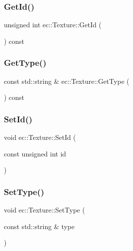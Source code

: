 \mbox{\label{classec_1_1_texture_a141c573d98b174bfe15175913a9cfc34}} 
\subsubsection{\texorpdfstring{Get\+Id()}{GetId()}}
{\footnotesize\ttfamily unsigned int ec\+::\+Texture\+::\+Get\+Id (\begin{DoxyParamCaption}{ }\end{DoxyParamCaption}) const}

\mbox{\label{classec_1_1_texture_a5062d684caa000641817a918451eb76a}} 
\subsubsection{\texorpdfstring{Get\+Type()}{GetType()}}
{\footnotesize\ttfamily const std\+::string \& ec\+::\+Texture\+::\+Get\+Type (\begin{DoxyParamCaption}{ }\end{DoxyParamCaption}) const}

\mbox{\label{classec_1_1_texture_a83b67b45fa6991f79141f025dd5e269a}} 
\subsubsection{\texorpdfstring{Set\+Id()}{SetId()}}
{\footnotesize\ttfamily void ec\+::\+Texture\+::\+Set\+Id (\begin{DoxyParamCaption}\item[{const unsigned int}]{id }\end{DoxyParamCaption})}

\mbox{\label{classec_1_1_texture_a190cc58745400d490ea492112196cb2d}} 
\subsubsection{\texorpdfstring{Set\+Type()}{SetType()}}
{\footnotesize\ttfamily void ec\+::\+Texture\+::\+Set\+Type (\begin{DoxyParamCaption}\item[{const std\+::string \&}]{type }\end{DoxyParamCaption})}

